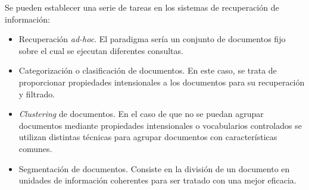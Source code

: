 Se pueden establecer una serie de tareas en los sistemas de 
recuperación de información:
\begin{itemize}
 \item Recuperación \textit{ad-hoc}. El paradigma sería un conjunto de
documentos fijo sobre el cual se ejecutan diferentes consultas.
\item Categorización o clasificación de documentos. En este caso, 
se trata de proporcionar propiedades intensionales a los documentos 
para su recuperación y filtrado.
\item \textit{Clustering} de documentos. En el caso de que no se puedan 
agrupar documentos mediante propiedades intensionales o vocabularios 
controlados se utilizan distintas técnicas para agrupar documentos 
con características comunes.
\item Segmentación de documentos. Consiste en la división de un documento 
en unidades de información coherentes para ser tratado con una mejor 
eficacia.
\end{itemize}

